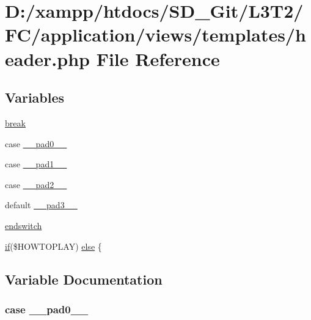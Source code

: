 \hypertarget{header_8php}{}\section{D\+:/xampp/htdocs/\+S\+D\+\_\+\+Git/\+L3\+T2/\+F\+C/application/views/templates/header.php File Reference}
\label{header_8php}
\subsection*{Variables}
\begin{DoxyCompactItemize}
\item 
\hyperlink{header_8php_a91cf6fbebedd86150a36e5ac3d5d3bfc}{break}
\item 
case \hyperlink{header_8php_a32d4e07d06bb73a334918feffe29f946}{\+\_\+\+\_\+pad0\+\_\+\+\_\+}
\item 
case \hyperlink{header_8php_a0580bd55f19d2b72a1a95d51264aa4b6}{\+\_\+\+\_\+pad1\+\_\+\+\_\+}
\item 
case \hyperlink{header_8php_abe92b4cb0620171d6cf7ac6adf17d384}{\+\_\+\+\_\+pad2\+\_\+\+\_\+}
\item 
default \hyperlink{header_8php_a76c33ed6e732a032294a3b922d9271f2}{\+\_\+\+\_\+pad3\+\_\+\+\_\+}
\item 
\hyperlink{header_8php_a2a28576eff585b9b1eac1d15c127c957}{endswitch}
\item 
\hyperlink{excanvas_8js_a409038cddd5fb941140f7ff76f5b7b15}{if}(\$H\+O\+W\+T\+O\+P\+L\+A\+Y) \hyperlink{header_8php_a63f7e024b22f9c05a179d6f20da00b94}{else} \{
\end{DoxyCompactItemize}


\subsection{Variable Documentation}
\hypertarget{header_8php_a32d4e07d06bb73a334918feffe29f946}{}
\subsubsection[{\+\_\+\+\_\+pad0\+\_\+\+\_\+}]{\setlength{\rightskip}{0pt plus 5cm}case \+\_\+\+\_\+pad0\+\_\+\+\_\+}\label{header_8php_a32d4e07d06bb73a334918feffe29f946}
\hypertarget{header_8php_a0580bd55f19d2b72a1a95d51264aa4b6}{}
